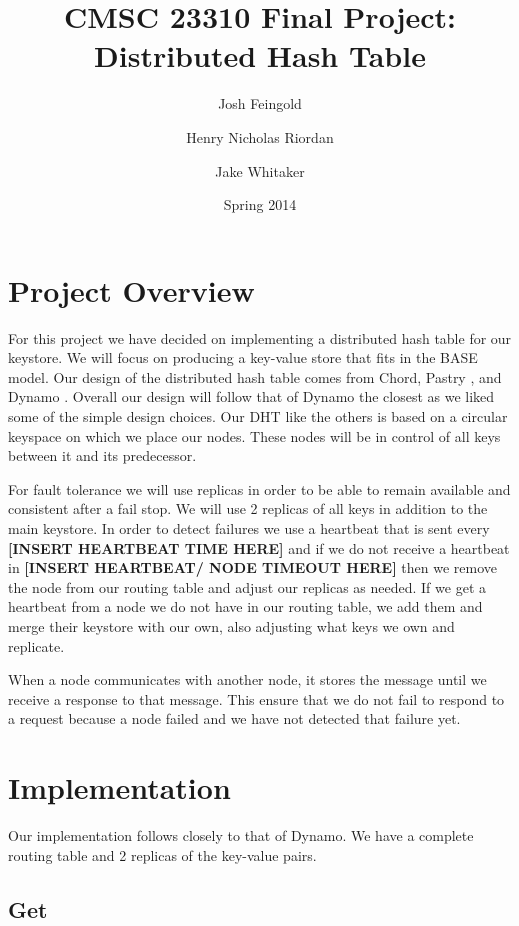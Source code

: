 \documentclass[11pt]{article}
\title{CMSC 23310 Final Project:\\
Distributed Hash Table}
\author{Josh Feingold \and Henry Nicholas Riordan \and Jake Whitaker}
\date{Spring 2014}
\begin{document}
\maketitle

\section{Project Overview}\label{sec:overview}

For this project we have decided on implementing a distributed hash table for our keystore. We will focus on producing a key-value store that fits in the BASE model.\cite{Fox_1997_BASE} Our design of the distributed hash table comes from Chord\cite {Stoica_2003_Chord}, Pastry \cite{Rowstron_2001_Pastry}, and Dynamo \cite{DeCandia_2007_Dynamo}. Overall our design will follow that of Dynamo the closest as we liked some of the simple design choices. Our DHT like the others is based on a circular keyspace on which we place our nodes. These nodes will be in control of all keys between it and its predecessor. 

For fault tolerance we will use replicas in order to be able to remain available and consistent after a fail stop. We will use 2 replicas of all keys in addition to the main keystore. In order to detect failures we use a heartbeat that is sent every \textbf{[INSERT HEARTBEAT TIME HERE]} and if we do not receive a heartbeat in \textbf{[INSERT HEARTBEAT/ NODE TIMEOUT HERE]} then we remove the node from our routing table and adjust our replicas as needed. If we get a heartbeat from a node we do not have in our routing table, we add them and merge their keystore with our own, also adjusting what keys we own and replicate.

When a node communicates with another node, it stores the message until we receive a response to that message. This ensure that we do not fail to respond to a request because a node failed and we have not detected that failure yet.

\section{Implementation}\label{sec:imple}

Our implementation follows closely to that of Dynamo. We have a complete routing table and 2 replicas of the key-value pairs.

\subsection{Get}\label{sec:get}
\end{document}
